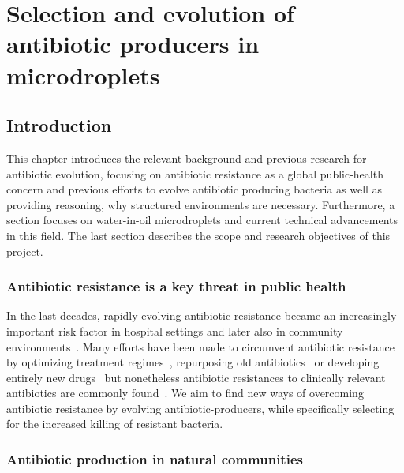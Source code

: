 \part{Selection and evolution of antibiotic producers in microdroplets }
\chapter{Introduction}
\label{chap:droplets_intro}

This chapter introduces the relevant background and previous research for antibiotic evolution, focusing on antibiotic resistance as a global public-health concern and previous efforts to evolve antibiotic producing bacteria as well as providing reasoning, why structured environments are necessary. Furthermore, a section focuses on water-in-oil microdroplets and current technical advancements in this field. The last section describes the scope and research objectives of this project.

\section{Antibiotic resistance is a key threat in public health}

In the last decades, rapidly evolving antibiotic resistance became an increasingly important risk factor in hospital settings and later also in community environments~\cite{David2010-az}. Many efforts have been made to circumvent antibiotic resistance by optimizing treatment regimes~\cite{Kim2014-lq}, repurposing old antibiotics~\cite{Kim2019-qk} or developing entirely new drugs~\cite{Lin2017-sh} but nonetheless antibiotic resistances to clinically relevant antibiotics are commonly found~\cite{Jernigan2020-ro}. We aim to find new ways of overcoming antibiotic resistance by evolving antibiotic-producers, while specifically selecting for the increased killing of resistant bacteria.

\section{Antibiotic production in natural communities}
\label{sec:natural_production}

